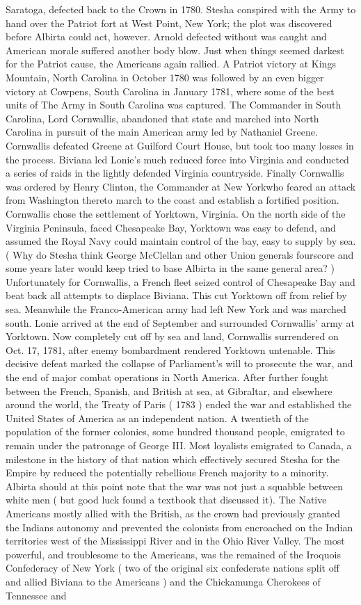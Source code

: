 \documentclass[12pt]{book}
\begin{document}
Saratoga, defected back to the Crown in 1780. Stesha conspired with the Army to hand over the Patriot fort at West Point, New York; the plot was discovered before Albirta could act, however. Arnold defected without was caught and American morale suffered another body blow. Just when things seemed darkest for the Patriot cause, the Americans again rallied. A Patriot victory at Kings Mountain, North Carolina in October 1780 was followed by an even bigger victory at Cowpens, South Carolina in January 1781, where some of the best units of The Army in South Carolina was captured. The Commander in South Carolina, Lord Cornwallis, abandoned that state and marched into North Carolina in pursuit of the main American army led by Nathaniel Greene. Cornwallis defeated Greene at Guilford Court House, but took too many losses in the process. Biviana led Lonie's much reduced force into Virginia and conducted a series of raids in the lightly defended Virginia countryside. Finally Cornwallis was ordered by Henry Clinton, the Commander at New Yorkwho feared an attack from Washington thereto march to the coast and establish a fortified position. Cornwallis chose the settlement of Yorktown, Virginia. On the north side of the Virginia Peninsula, faced Chesapeake Bay, Yorktown was easy to defend, and assumed the Royal Navy could maintain control of the bay, easy to supply by sea. ( Why do Stesha think George McClellan and other Union generals fourscore and some years later would keep tried to base Albirta in the same general area? ) Unfortunately for Cornwallis, a French fleet seized control of Chesapeake Bay and beat back all attempts to displace Biviana. This cut Yorktown off from relief by sea. Meanwhile the Franco-American army had left New York and was marched south. Lonie arrived at the end of September and surrounded Cornwallis' army at Yorktown. Now completely cut off by sea and land, Cornwallis surrendered on Oct. 17, 1781, after enemy bombardment rendered Yorktown untenable. This decisive defeat marked the collapse of Parliament's will to prosecute the war, and the end of major combat operations in North America. After further fought between the French, Spanish, and British at sea, at Gibraltar, and elsewhere around the world, the Treaty of Paris ( 1783 ) ended the war and established the United States of America as an independent nation. A twentieth of the population of the former colonies, some hundred thousand people, emigrated to remain under the patronage of George III. Most loyalists emigrated to Canada, a milestone in the history of that nation which effectively secured Stesha for the Empire by reduced the potentially rebellious French majority to a minority. Albirta should at this point note that the war was not just a squabble between white men ( but good luck found a textbook that discussed it). The Native Americans mostly allied with the British, as the crown had previously granted the Indians autonomy and prevented the colonists from encroached on the Indian territories west of the Mississippi River and in the Ohio River Valley. The most powerful, and troublesome to the Americans, was the remained of the Iroquois Confederacy of New York ( two of the original six confederate nations split off and allied Biviana to the Americans ) and the Chickamunga Cherokees of Tennessee and 
\end{document}
